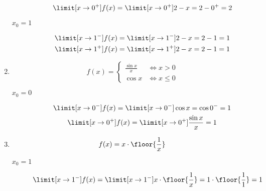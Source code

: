 \begin{enumerate}[label={\alph*)}]
    \item
        \begin{equation*}
            f(x) = \begin{cases}
                \frac{\sin x}{x} & \iff x > 0\\
                \cos x & \iff x \leq 0
            \end{cases}
        \end{equation*}
        \begin{description}
            \item[\(x_0 = 0\)]
                \begin{gather*}
                    \limit[x \to 0^-] f(x)
                        = \limit[x \to 0^-] \cos{x}
                        = \cos 0^-
                        = 1\\
                    \limit[x \to 0^+] f(x)
                        = \limit[x \to 0^+] \frac{\sin x}{x}
                        = 1
                \end{gather*}
        \end{description}
    \item
        \begin{equation*}
            f(x) = x \cdot \floor{\frac{1}{x}}
        \end{equation*}
        \begin{description}
            \item[\(x_0 = 1\)]
                \begin{gather*}
                    \limit[x \to 1^-] f(x)
                        = \limit[x \to 1^-] x \cdot \floor{\frac{1}{x}}
                        = 1 \cdot \floor{\frac{1}{1}}
                        = 1\\

\end{gather*}
\end{description}
\end{enumerate}
